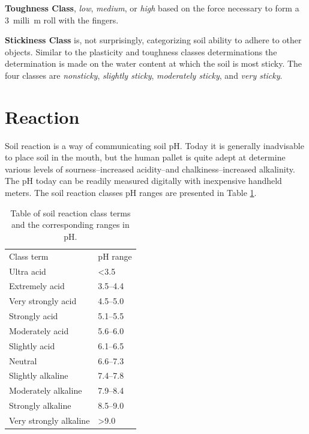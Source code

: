 \documentclass[letterpaper, 12pt]{article}
\begin{document}
\textbf{Toughness Class}, \textit{low},  \textit{medium}, or \textit{high} based on the force necessary to form a \qty{3}{milli\metre} roll with the fingers.

 \textbf{Stickiness Class} is, not surprisingly, categorizing soil ability to adhere to other objects. Similar to the plasticity and toughness classes determinations the determination is made on the water content at which the soil is most sticky. The four classes are \textit{nonsticky}, \textit{slightly sticky}, \textit{moderately sticky}, and \textit{very sticky}.
 
 
\section{Reaction}
\label{reaction}

Soil reaction is a way of communicating soil pH. Today it is generally inadvisable to place soil in the mouth, but the human pallet is quite adept at determine various levels of sourness–increased acidity–and chalkiness–increased alkalinity. The pH today can be readily measured digitally with inexpensive handheld meters. The soil reaction classes pH ranges are presented in Table \ref{tab:reactionclass}.

\begin{table}[!htbp]
\centering
\caption{Table of soil reaction class terms and the corresponding ranges in pH.}
\label{tab:reactionclass}
\begin{tabular}{ll}
\hline
Class term             & pH range         \\ \hhline{==}
Ultra acid             & \textless 3.5    \\
Extremely acid         & 3.5–4.4          \\
Very strongly acid     & 4.5–5.0          \\
Strongly acid          & 5.1–5.5          \\
Moderately acid        & 5.6–6.0          \\
Slightly acid          & 6.1–6.5          \\
Neutral                & 6.6–7.3          \\
Slightly alkaline      & 7.4–7.8          \\
Moderately alkaline    & 7.9–8.4          \\
Strongly alkaline      & 8.5–9.0          \\
Very strongly alkaline & \textgreater 9.0 \\
\hline
\end{tabular}
\end{table}
\end{document}
